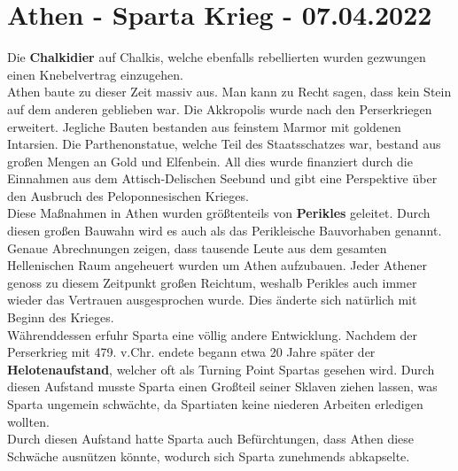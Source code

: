\documentclass{article}
\begin{document}
	\section{Athen - Sparta Krieg - 07.04.2022}
	Die \textbf{Chalkidier} auf Chalkis, welche ebenfalls rebellierten wurden gezwungen einen Knebelvertrag einzugehen. \\
	Athen baute zu dieser Zeit massiv aus. Man kann zu Recht sagen, dass kein Stein auf dem anderen geblieben war. Die Akkropolis wurde nach den Perserkriegen erweitert. Jegliche Bauten bestanden aus feinstem Marmor mit goldenen Intarsien. Die Parthenonstatue, welche Teil des Staatsschatzes war, bestand aus großen Mengen an Gold und Elfenbein. All dies wurde finanziert durch die Einnahmen aus dem Attisch-Delischen Seebund und gibt eine Perspektive über den Ausbruch des Peloponnesischen Krieges. \\
	Diese Maßnahmen in Athen wurden größtenteils von \textbf{Perikles} geleitet. Durch diesen großen Bauwahn wird es auch als das Perikleische Bauvorhaben genannt. Genaue Abrechnungen zeigen, dass tausende Leute aus dem gesamten Hellenischen Raum angeheuert wurden um Athen aufzubauen. Jeder Athener genoss zu diesem Zeitpunkt großen Reichtum, weshalb Perikles auch immer wieder das Vertrauen ausgesprochen wurde. Dies änderte sich natürlich mit Beginn des Krieges. \\
	Währenddessen erfuhr Sparta eine völlig andere Entwicklung. Nachdem der Perserkrieg mit 479. v.Chr. endete begann etwa 20 Jahre später der \textbf{Helotenaufstand}, welcher oft als Turning Point Spartas gesehen wird. Durch diesen Aufstand musste Sparta einen Großteil seiner Sklaven ziehen lassen, was Sparta ungemein schwächte, da Spartiaten keine niederen Arbeiten erledigen wollten. \\
	Durch diesen Aufstand hatte Sparta auch Befürchtungen, dass Athen diese Schwäche ausnützen könnte, wodurch sich Sparta zunehmends abkapselte. \\
\end{document}
